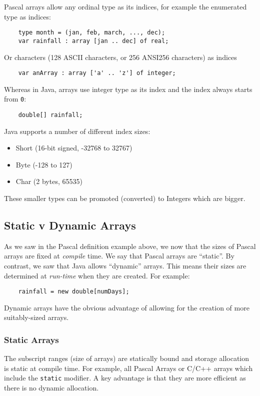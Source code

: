 Pascal arrays allow any ordinal type as its indices, for example the enumerated type as indices:
\begin{verbatim}
    type month = (jan, feb, march, ..., dec);
    var rainfall : array [jan .. dec] of real;
\end{verbatim}
Or characters (128 ASCII characters, or 256 ANSI256 characters) as indices
\begin{verbatim}
    var anArray : array ['a' .. 'z'] of integer;
\end{verbatim}
Whereas in Java, arrays use integer type as its index and the index always starts from \verb|0|:
\begin{verbatim}
    double[] rainfall;
\end{verbatim}
Java supports a number of different index sizes:
\begin{itemize}
    \item Short (16-bit signed, -32768 to 32767)
    \item Byte (-128 to 127)
    \item Char (2 bytes, 65535)
\end{itemize}
These smaller types can be promoted (converted) to Integers which are bigger.

\subsection{Static v Dynamic Arrays}
As we saw in the Pascal definition example above, we now that the sizes of Pascal arrays are fixed at \textit{compile} time. We say that Pascal arrays are ``static''. By contrast, we saw that Java allows ``dynamic'' arrays. This means their sizes are determined at \textit{run-time} when they are created. For example:
\begin{verbatim}
    rainfall = new double[numDays];
\end{verbatim}

Dynamic arrays have the obvious advantage of allowing for the creation of more suitably-sized arrays.

\subsubsection{Static Arrays}
The subscript ranges (size of arrays) are statically bound and storage allocation is static at compile time. For example, all Pascal Arrays or C/C++ arrays which include the \verb|static| modifier. A key advantage is that they are more efficient as there is no dynamic allocation.

